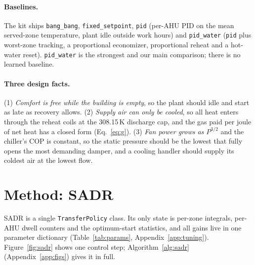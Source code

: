 \documentclass{article}
\begin{document}
\paragraph{Baselines.} The kit ships \texttt{bang\_bang}, \texttt{fixed\_setpoint}, \texttt{pid} (per-AHU PID on the mean served-zone temperature, plant idle outside work hours) and \texttt{pid\_water} (\texttt{pid} plus worst-zone tracking, a proportional economizer, proportional reheat and a hot-water reset). \texttt{pid\_water} is the strongest and our main comparison; there is no learned baseline.

\paragraph{Three design facts.} (1) \emph{Comfort is free while the building is empty}, so the plant should idle and start as late as recovery allows. (2) \emph{Supply air can only be cooled}, so all heat enters through the reheat coils at the 308.15\,K discharge cap, and the gas paid per joule of net heat has a closed form (Eq.~\ref{eq:g}). (3) \emph{Fan power grows as $P^{3/2}$} and the chiller's COP is constant, so the static pressure should be the lowest that fully opens the most demanding damper, and a cooling handler should supply its coldest air at the lowest flow.

\section{Method: SADR}
\label{sec:method}

SADR is a single \texttt{TransferPolicy} class. Its only state is per-zone integrals, per-AHU dwell counters and the optimum-start statistics, and all gains live in one parameter dictionary (Table~\ref{tab:params}, Appendix~\ref{app:tuning}). Figure~\ref{fig:sadr} shows one control step; Algorithm~\ref{alg:sadr} (Appendix~\ref{app:figs}) gives it in full.
\end{document}
